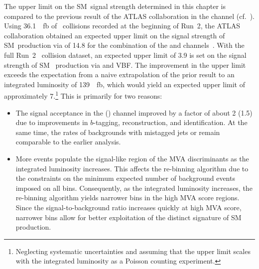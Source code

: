 The upper limit on the SM~\HH signal strength determined in this chapter is
compared to the previous result of the ATLAS collaboration in the \bbtautau
channel (cf.~). Using \SI{36.1}{\per\femto\barn}
of \pp~collisions recorded at the beginning of Run~2, the ATLAS collaboration
obtained an expected upper limit on the signal strength of SM~\HH production via
\ggF of 14.8 for the combination of the \lephad and \hadhad
channels~\cite{HIGG-2016-16-witherratum}. With the full Run~2 \pp~collision
dataset, an expected upper limit of 3.9 is set on the signal strength of SM~\HH
production via \ggF and VBF. The improvement in the upper limit exceeds the
expectation from a naive extrapolation of the prior result to an integrated
luminosity of \SI{139}{\per\femto\barn}, which would yield an expected upper
limit of approximately 7.\footnote{Neglecting systematic uncertainties and
  assuming that the upper limit scales with the integrated luminosity as a
  Poisson counting experiment.} This is primarily for two reasons:
\begin{itemize}

\item The signal acceptance in the \hadhad (\lephad) channel improved by a
  factor of about 2 (1.5) due to improvements in $b$-tagging, \tauhadvis
  reconstruction, and \tauhadvis identification. At the same time, the rates of
  backgrounds with mistagged jets or \faketauhadvis remain comparable to the
  earlier analysis.

\item More events populate the signal-like region of the MVA discriminants as
  the integrated luminosity increases. This affects the re-binning algorithm due
  to the constraints on the minimum expected number of background events imposed
  on all bins. Consequently, as the integrated luminosity increases, the
  re-binning algorithm yields narrower bins in the high MVA score regions. Since
  the signal-to-background ratio increases quickly at high MVA score, narrower
  bins allow for better exploitation of the distinct signature of SM~\HH
  production.

\end{itemize}

